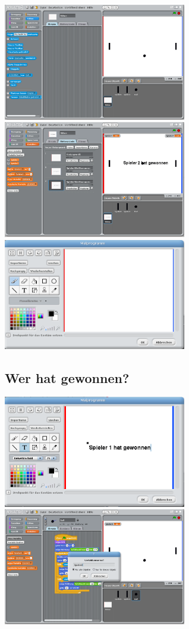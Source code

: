 \includegraphics[width=0.6\textwidth]{images/aufgabe5_pong_hintergrund_1.png}
\includegraphics[width=0.6\textwidth]{images/aufgabe5_pong_hintergrund_2.png}
\includegraphics[width=0.6\textwidth]{images/aufgabe5_pong_hintergrund_malen.png}


\subsection{Wer hat gewonnen?}
\includegraphics[width=0.6\textwidth]{images/aufgabe5_pong_hintergrund_gewonnen_malen.png}
\includegraphics[width=0.6\textwidth]{images/aufgabe5_pong_spieler_variablen_1.png}

